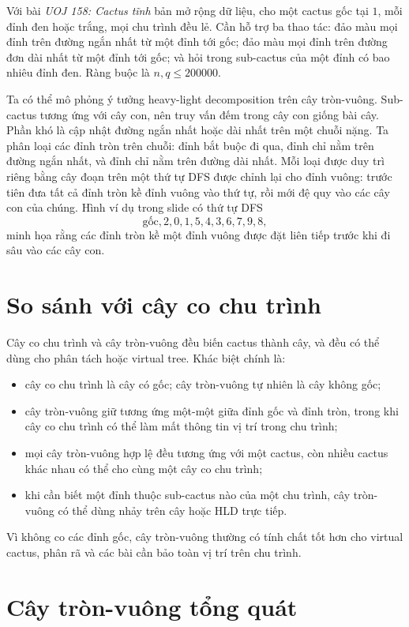 \documentclass[11pt]{article}
\begin{document}
Với bài \emph{UOJ 158: Cactus tĩnh} bản mở rộng dữ liệu, cho một cactus gốc
tại \(1\), mỗi đỉnh đen hoặc trắng, mọi chu trình đều lẻ. Cần hỗ trợ ba thao
tác: đảo màu mọi đỉnh trên đường ngắn nhất từ một đỉnh tới gốc; đảo màu mọi
đỉnh trên đường đơn dài nhất từ một đỉnh tới gốc; và hỏi trong sub-cactus của
một đỉnh có bao nhiêu đỉnh đen. Ràng buộc là \(n,q\le 200000\).

Ta có thể mô phỏng ý tưởng heavy-light decomposition trên cây tròn-vuông.
Sub-cactus tương ứng với cây con, nên truy vấn đếm trong cây con giống bài
cây. Phần khó là cập nhật đường ngắn nhất hoặc dài nhất trên một chuỗi nặng.
Ta phân loại các đỉnh tròn trên chuỗi: đỉnh bắt buộc đi qua, đỉnh chỉ nằm trên
đường ngắn nhất, và đỉnh chỉ nằm trên đường dài nhất. Mỗi loại được duy trì
riêng bằng cây đoạn trên một thứ tự DFS được chỉnh lại cho đỉnh vuông: trước
tiên đưa tất cả đỉnh tròn kề đỉnh vuông vào thứ tự, rồi mới đệ quy vào các cây
con của chúng. Hình ví dụ trong slide có thứ tự DFS
\[
  \text{gốc},2,0,1,5,4,3,6,7,9,8,
\]
minh họa rằng các đỉnh tròn kề một đỉnh vuông được đặt liên tiếp trước khi đi
sâu vào các cây con.

\section{So sánh với cây co chu trình}

Cây co chu trình và cây tròn-vuông đều biến cactus thành cây, và đều có thể
dùng cho phân tách hoặc virtual tree. Khác biệt chính là:
\begin{itemize}
  \item cây co chu trình là cây có gốc; cây tròn-vuông tự nhiên là cây không
        gốc;
  \item cây tròn-vuông giữ tương ứng một-một giữa đỉnh gốc và đỉnh tròn, trong
        khi cây co chu trình có thể làm mất thông tin vị trí trong chu trình;
  \item mọi cây tròn-vuông hợp lệ đều tương ứng với một cactus, còn nhiều
        cactus khác nhau có thể cho cùng một cây co chu trình;
  \item khi cần biết một đỉnh thuộc sub-cactus nào của một chu trình, cây
        tròn-vuông có thể dùng nhảy trên cây hoặc HLD trực tiếp.
\end{itemize}
Vì không co các đỉnh gốc, cây tròn-vuông thường có tính chất tốt hơn cho
virtual cactus, phân rã và các bài cần bảo toàn vị trí trên chu trình.

\section{Cây tròn-vuông tổng quát}
\end{document}
